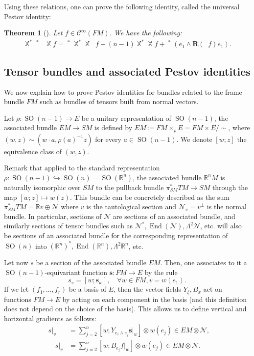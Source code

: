 \documentclass[12pt]{amsart}
\numberwithin{numbering}{section}
\theoremstyle{plain}
\newtheorem{thm}[numbering]{Theorem}
\theoremstyle{definition}
\theoremstyle{remark}
\numberwithin{equation}{section}
\DeclareMathOperator{\End}{End}
\DeclareMathOperator{\SO}{SO}
\DeclareMathOperator{\nv}{\nabla_{\mathbb{V}}}
\DeclareMathOperator{\nh}{\nabla_{\mathbb{H}}}
\DeclareMathOperator{\xx}{\mathbb{X}}
\newcommand{\psm}{\pi_{SM}}
\newcommand{\rfm}{\mathbf{R}}
\newcommand{\R}{\mathbb{R}}
\begin{document}
Using these relations, one can prove the following identity, called the universal Pestov identity:

\begin{thm}[{\cite[Proposition 3.2]{cekic2025pestov}}]
Let $f \in \mathcal{C}^\infty(FM)$. We have the following:
\begin{align}
\xx^* \nv^* \nv \xx f = \nv^* \xx^* \xx \nv f + (n-1) \xx^* \xx f + \nv^* (e_1 \wedge \rfm(\nv f) e_1).
\end{align}
\end{thm}


\subsection{Tensor bundles and associated Pestov identities} \label{sec:levi_civita_pestov_tensor}

We now explain how to prove Pestov identities for bundles related to the frame bundle $FM$ such as bundles of tensors built from normal vectors.

Let $\rho: \SO(n-1) \to E$ be a unitary representation of $\SO(n-1)$, the associated bundle $EM \to SM$ is defined by $EM \coloneq FM \times_\rho E = FM \times E / \sim$, where $(w, z) \sim (w \cdot a, \rho(a)^{-1}z)$ for every $a \in \SO(n-1)$. We denote $[w; z]$ the equivalence class of $(w, z)$.

Remark that applied to the standard representation $\rho: \SO(n-1) \hookrightarrow \SO(n) = \SO(\R^{n})$, the associated bundle $\R^{n} M$ is naturally isomorphic over $SM$ to the pullback bundle $\psm^* TM \to SM$ through the map $[w; z] \mapsto w(z)$. This bundle can be concretely described as the sum $\psm^* TM = \R v \oplus \mathcal{N}$ where $v$ is the tautological section and $\mathcal{N}_v = v^\perp$ is the normal bundle. In particular, sections of $\mathcal{N}$ are sections of an associated bundle, and similarly sections of tensor bundles such as $\mathcal{N}^*, \End(\mathcal{N}), \Lambda^2 \mathcal{N}$, etc. will also be sections of an associated bundle for the corresponding representation of $\SO(n)$ into $(\R^n)^*, \End(\R^n), \Lambda^2 \R^n$, etc. 

Let now $s$ be a section of the associated bundle $EM$. Then, one associates to it a $\SO(n-1)$-equivariant function $\mathbf{s}: FM \to E$ by the rule 
\[ s_v = [w; \mathbf{s}_w], \quad \forall w \in FM, v = w(e_1). \]
If we let $(f_1, \ldots, f_r)$ be a basis of $E$, then the vector fields $Y_\xi, B_x$ act on functions $FM \to E$ by acting on each component in the basis (and this definition does not depend on the choice of the basis). This allows us to define vertical and horizontal gradients as follows:
\begin{align}
\nv s \vert_v &= \sum_{j=2}^n [w; Y_{e_1 \wedge e_j} \mathbf{s} \vert_w] \otimes w(e_j) \in EM \otimes \mathcal{N}, \\ 
\quad \nh s \vert_v &= \sum_{j=2}^n [w; B_{e_j} f \vert_w] \otimes w(e_j) \in EM \otimes \mathcal{N}.
\end{align} 
\end{document}
